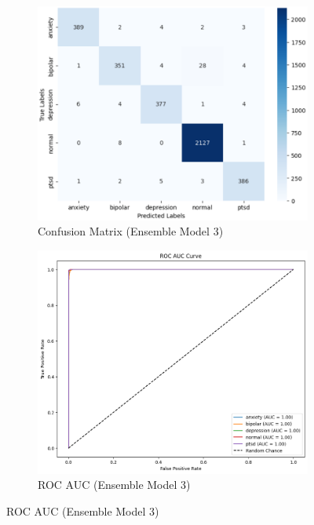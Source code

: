 \vspace{-1em}

\begin{figure}[h!]
    \centering
    \begin{subfigure}[b]{0.47\textwidth}
        \centering
        \includegraphics[width=\textwidth]{Images/EM3 CM.png}
        \caption*{Confusion Matrix (Ensemble Model 3)}
        \label{em3 cm}  %
    \end{subfigure}
    \hfill
    \begin{subfigure}[b]{0.47\textwidth}
        \centering
        \includegraphics[width=\textwidth]{Images/EM3 ROC.png}
        \caption*{ROC AUC (Ensemble Model 3)}
        \label{em3 roc}  %
    \end{subfigure}
    \label{fig:ensemble_model3_comparison}
\end{figure}

